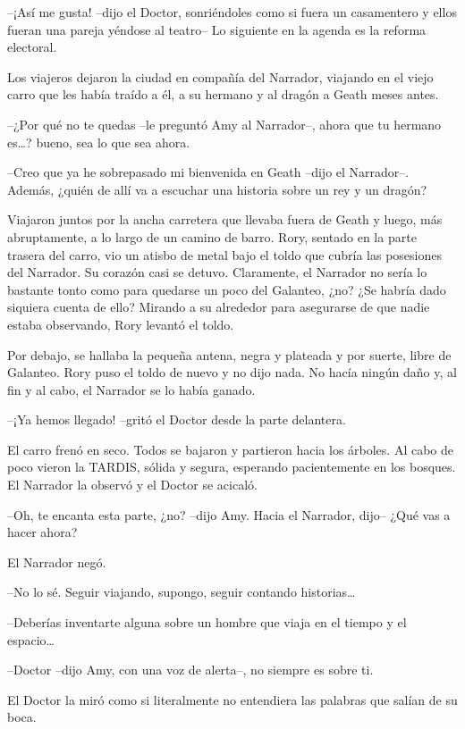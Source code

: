 {--¡Así me gusta! --dijo el Doctor, sonriéndoles como si fuera un
	casamentero y ellos fueran una pareja yéndose al teatro-- Lo siguiente
en la agenda es la reforma electoral.}

\mbox{}

{Los viajeros dejaron la ciudad en compañía del Narrador, viajando en el
	viejo carro que les había traído a él, a su hermano y al dragón a Geath
meses antes.}

{--¿Por qué no te quedas --le preguntó Amy al Narrador--, ahora que tu
	hermano es\ldots{}? bueno, sea lo que sea ahora.}

{--Creo que ya he sobrepasado mi bienvenida en Geath --dijo el
	Narrador--. Además, ¿quién de allí va a escuchar una historia sobre un
rey y un dragón?}

{Viajaron juntos por la ancha carretera que llevaba fuera de Geath y
	luego, más abruptamente, a lo largo de un camino de barro. Rory, sentado
	en la parte trasera del carro, vio un atisbo de metal bajo el toldo que
	cubría las posesiones del Narrador. Su corazón casi se detuvo.
	Claramente, el Narrador no sería lo bastante tonto como para quedarse un
	poco del Galanteo, ¿no? ¿Se habría dado siquiera cuenta de ello? Mirando
	a su alrededor para asegurarse de que nadie estaba observando, Rory
levantó el toldo.}

{Por debajo, se hallaba la pequeña antena, negra y plateada y por
	suerte, libre de Galanteo. Rory puso el toldo de nuevo y no dijo nada.
	No hacía ningún daño y, al fin y al cabo, el Narrador se lo había
ganado.}

{--¡Ya hemos llegado! --gritó el Doctor desde la parte delantera.}

{El carro frenó en seco. Todos se bajaron y partieron hacia los árboles.
	Al cabo de poco vieron la TARDIS, sólida y segura, esperando
	pacientemente en los bosques. El Narrador la observó y el Doctor se
acicaló.}

{--Oh, te encanta esta parte, ¿no? --dijo Amy. Hacia el Narrador,
dijo-- ¿Qué vas a hacer ahora?}

{El Narrador negó.}

{--No lo sé. Seguir viajando, supongo, seguir contando
	historias\ldots{}}

{--Deberías inventarte alguna sobre un hombre que viaja en el tiempo y
	el espacio\ldots{}}

{--Doctor --dijo Amy, con una voz de alerta--, no siempre es sobre
ti.}

{El Doctor la miró como si literalmente no entendiera las palabras que
salían de su boca.}


